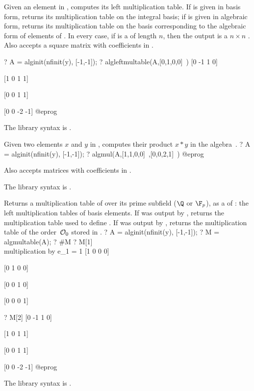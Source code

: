 \label{se:algleftmultable}
Given an element  in , computes its left multiplication
table. If  is given in basis form, returns its multiplication table on
the integral basis; if  is given in algebraic form, returns its
multiplication table on the basis corresponding to the algebraic form of
elements of . In every case, if  is a  of length $n$,
then the output is a $n\times n$ .
Also accepts a square matrix with coefficients in .

\bprog
? A = alginit(nfinit(y), [-1,-1]);
? algleftmultable(A,[0,1,0,0]~)
[0 -1  1  0]

[1  0  1  1]

[0  0  1  1]

[0  0 -2 -1]
@eprog

The library syntax is .

\label{se:algmul}
Given two elements $x$ and $y$ in , computes their product $x*y$
in the algebra~.
\bprog
? A = alginit(nfinit(y), [-1,-1]);
? algmul(A,[1,1,0,0]~,[0,0,2,1]~)
@eprog

Also accepts matrices with coefficients in .

The library syntax is .

\label{se:algmultable}
Returns a multiplication table of  over its
prime subfield ($\Q$ or $\F_p$), as a  of : the left
multiplication tables of basis elements. If  was output by
, returns the multiplication table used to define .
If  was output by , returns the multiplication table of
the order~${\cal O}_0$ stored in .
\bprog
? A = alginit(nfinit(y), [-1,-1]);
? M = algmultable(A);
? #M
? M[1]  \\ multiplication by e_1 = 1
[1 0 0 0]

[0 1 0 0]

[0 0 1 0]

[0 0 0 1]

? M[2]
[0 -1  1  0]

[1  0  1  1]

[0  0  1  1]

[0  0 -2 -1]
@eprog

The library syntax is .

